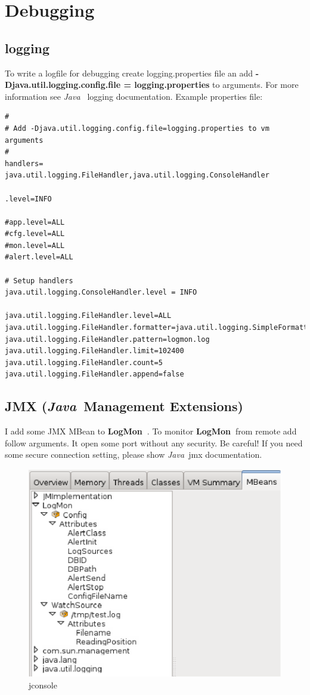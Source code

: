 \documentclass[11pt,a4paper]{article}
\newcommand{\logmon}{\textbf{LogMon\ }}
\newcommand{\java}{\textit{Java\ }}
\begin{document}
\section{Debugging}

\subsection{logging}

To write a logfile for debugging create logging.properties file an add
\textbf{-Djava.util.logging.config.file = logging.properties} to arguments.
For more information see \java
logging documentation. Example properties file:

\begin{verbatim}
#
# Add -Djava.util.logging.config.file=logging.properties to vm arguments
#
handlers= java.util.logging.FileHandler,java.util.logging.ConsoleHandler

.level=INFO

#app.level=ALL
#cfg.level=ALL
#mon.level=ALL
#alert.level=ALL

# Setup handlers
java.util.logging.ConsoleHandler.level = INFO

java.util.logging.FileHandler.level=ALL
java.util.logging.FileHandler.formatter=java.util.logging.SimpleFormatter
java.util.logging.FileHandler.pattern=logmon.log
java.util.logging.FileHandler.limit=102400
java.util.logging.FileHandler.count=5
java.util.logging.FileHandler.append=false

\end{verbatim}

\subsection{JMX (\java Management Extensions)}

I add some JMX MBean to \logmon. To monitor \logmon from remote add follow
arguments. It open some port without any security. Be careful! 
If you need some secure connection setting, please show \java jmx documentation.

\begin{figure}[h]
\centering
\includegraphics{img/jconsole.eps}
\caption{jconsole}
\end{figure}
\end{document}
